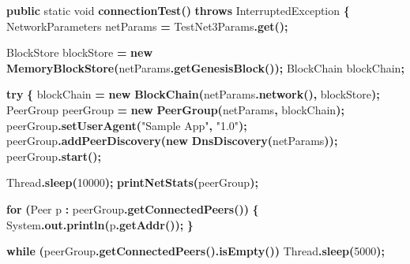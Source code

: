\documentclass[
  italian,
  openany]{book}
\newenvironment{Shaded}{\begin{snugshade}}{\end{snugshade}}
\newcommand{\BuiltInTok}[1]{#1}
\newcommand{\ControlFlowTok}[1]{\textcolor[rgb]{0.13,0.29,0.53}{\textbf{#1}}}
\newcommand{\DataTypeTok}[1]{\textcolor[rgb]{0.13,0.29,0.53}{#1}}
\newcommand{\DecValTok}[1]{\textcolor[rgb]{0.00,0.00,0.81}{#1}}
\newcommand{\FunctionTok}[1]{\textcolor[rgb]{0.13,0.29,0.53}{\textbf{#1}}}
\newcommand{\KeywordTok}[1]{\textcolor[rgb]{0.13,0.29,0.53}{\textbf{#1}}}
\newcommand{\NormalTok}[1]{#1}
\newcommand{\OperatorTok}[1]{\textcolor[rgb]{0.81,0.36,0.00}{\textbf{#1}}}
\newcommand{\StringTok}[1]{\textcolor[rgb]{0.31,0.60,0.02}{#1}}
\begin{document}
\begin{Shaded}
\begin{Highlighting}[]
\KeywordTok{public} \DataTypeTok{static} \DataTypeTok{void} \FunctionTok{connectionTest}\OperatorTok{()} \KeywordTok{throws} \BuiltInTok{InterruptedException} \OperatorTok{\{}
\NormalTok{    NetworkParameters netParams }\OperatorTok{=}\NormalTok{ TestNet3Params}\OperatorTok{.}\FunctionTok{get}\OperatorTok{();}

\NormalTok{    BlockStore blockStore }\OperatorTok{=} \KeywordTok{new} \FunctionTok{MemoryBlockStore}\OperatorTok{(}\NormalTok{netParams}\OperatorTok{.}\FunctionTok{getGenesisBlock}\OperatorTok{());}
\NormalTok{    BlockChain blockChain}\OperatorTok{;}

    \ControlFlowTok{try} \OperatorTok{\{}
\NormalTok{        blockChain }\OperatorTok{=} \KeywordTok{new} \FunctionTok{BlockChain}\OperatorTok{(}\NormalTok{netParams}\OperatorTok{.}\FunctionTok{network}\OperatorTok{(),}\NormalTok{ blockStore}\OperatorTok{);}
\NormalTok{        PeerGroup peerGroup }\OperatorTok{=} \KeywordTok{new} \FunctionTok{PeerGroup}\OperatorTok{(}\NormalTok{netParams}\OperatorTok{,}\NormalTok{ blockChain}\OperatorTok{);}
\NormalTok{        peerGroup}\OperatorTok{.}\FunctionTok{setUserAgent}\OperatorTok{(}\StringTok{"Sample App"}\OperatorTok{,} \StringTok{"1.0"}\OperatorTok{);}
\NormalTok{        peerGroup}\OperatorTok{.}\FunctionTok{addPeerDiscovery}\OperatorTok{(}\KeywordTok{new} \FunctionTok{DnsDiscovery}\OperatorTok{(}\NormalTok{netParams}\OperatorTok{));}
\NormalTok{        peerGroup}\OperatorTok{.}\FunctionTok{start}\OperatorTok{();}

        \BuiltInTok{Thread}\OperatorTok{.}\FunctionTok{sleep}\OperatorTok{(}\DecValTok{10000}\OperatorTok{);}
        \FunctionTok{printNetStats}\OperatorTok{(}\NormalTok{peerGroup}\OperatorTok{);}

        \ControlFlowTok{for} \OperatorTok{(}\NormalTok{Peer p }\OperatorTok{:}\NormalTok{ peerGroup}\OperatorTok{.}\FunctionTok{getConnectedPeers}\OperatorTok{())} \OperatorTok{\{}
            \BuiltInTok{System}\OperatorTok{.}\FunctionTok{out}\OperatorTok{.}\FunctionTok{println}\OperatorTok{(}\NormalTok{p}\OperatorTok{.}\FunctionTok{getAddr}\OperatorTok{());}
        \OperatorTok{\}}

        \ControlFlowTok{while} \OperatorTok{(}\NormalTok{peerGroup}\OperatorTok{.}\FunctionTok{getConnectedPeers}\OperatorTok{().}\FunctionTok{isEmpty}\OperatorTok{())}
            \BuiltInTok{Thread}\OperatorTok{.}\FunctionTok{sleep}\OperatorTok{(}\DecValTok{5000}\OperatorTok{);}


\end{Highlighting}
\end{Shaded}
\end{document}
